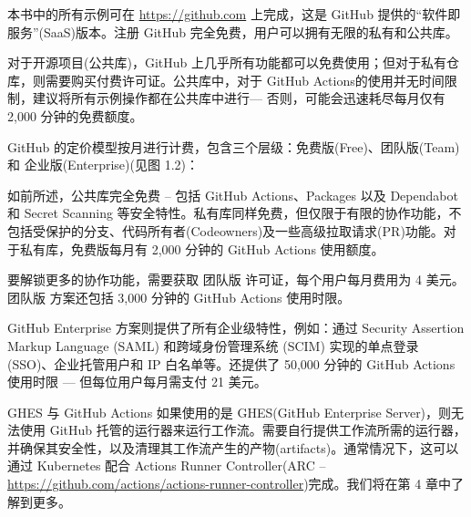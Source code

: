 本书中的所有示例可在 \url{https://github.com} 上完成，这是 GitHub 提供的“软件即服务”(SaaS)版本。注册 GitHub 完全免费，用户可以拥有无限的私有和公共库。

对于开源项目(公共库)，GitHub 上几乎所有功能都可以免费使用；但对于私有仓库，则需要购买付费许可证。公共库中，对于 GitHub Actions的使用并无时间限制，建议将所有示例操作都在公共库中进行--- 否则，可能会迅速耗尽每月仅有 2,000 分钟的免费额度。

GitHub 的定价模型按月进行计费，包含三个层级：免费版(Free)、团队版(Team) 和 企业版(Enterprise)(见图 1.2)：


如前所述，公共库完全免费 -- 包括 GitHub Actions、Packages 以及 Dependabot 和 Secret Scanning 等安全特性。私有库同样免费，但仅限于有限的协作功能，不包括受保护的分支、代码所有者(Codeowners)及一些高级拉取请求(PR)功能。对于私有库，免费版每月有 2,000 分钟的 GitHub Actions 使用额度。

要解锁更多的协作功能，需要获取 团队版 许可证，每个用户每月费用为 4 美元。团队版 方案还包括 3,000 分钟的 GitHub Actions 使用时限。

GitHub Enterprise 方案则提供了所有企业级特性，例如：通过 Security Assertion Markup Language (SAML) 和跨域身份管理系统 (SCIM) 实现的单点登录 (SSO)、企业托管用户和 IP 白名单等。还提供了 50,000 分钟的 GitHub Actions 使用时限 --- 但每位用户每月需支付 21 美元。

\begin{myTip}{GHES 与 GitHub Actions}
如果使用的是 GHES(GitHub Enterprise Server)，则无法使用 GitHub 托管的运行器来运行工作流。需要自行提供工作流所需的运行器，并确保其安全性，以及清理其工作流产生的产物(artifacts)。通常情况下，这可以通过 Kubernetes 配合 Actions Runner Controller(ARC – \url{https://github.com/actions/actions-runner-controller})完成。我们将在第 4 章中了解到更多。
\end{myTip}








